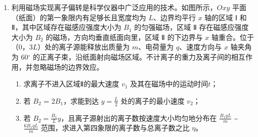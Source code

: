\documentclass[\gkver]{gaokaozhenti}
\begin{document}
\begin{enumerate}
\item
利用磁场实现离子偏转是科学仪器中广泛应用的技术。如图所示，$Oxy$ 平面（纸面）的第一象限内有足够长且宽度均为 $L$、边界均平行 $x$ 轴的区域 Ⅰ 和 Ⅱ，其中区域存在磁感应强度大小为 $B_{1}$ 的匀强磁场，区域 Ⅱ 存在磁感应强度大小为 $B_{2}$ 的磁场，方向均垂直纸面向里，区域 Ⅱ 的下边界与 $x$ 轴重合。位于（0，3$L$）处的离子源能释放出质量为 $m$、电荷量为 $q$、速度方向与 $x$ 轴夹角为 60${^\circ}$ 的正离子束，沿纸面射向磁场区域。不计离子的重力及离子间的相互作用，并忽略磁场的边界效应。
\begin{enumerate}
	\item
	求离子不进入区域Ⅱ的最大速度 $v_{1}$ 及其在磁场中的运动时间$t$；
	\item
	若 $B_{2}$ = 2$B_{1}$，求能到达 $y = \frac{L}{2}$ 处的离子的最小速度 $v_{2}$；
	\item
	若 $B_{2} = \frac{{{B_1}}}{L}y$，且离子源射出的离子数按速度大小均匀地分布在 $\frac{{{B_1}qL}}{m}$ \textasciitilde{} $\frac{{6{B_1}qL}}{m}$ 范围，求进入第四象限的离子数与总离子数之比 $\eta$。
\end{enumerate}
\onepicture[align=right, w=4.8cm]{}
\end{enumerate}
\end{document}
